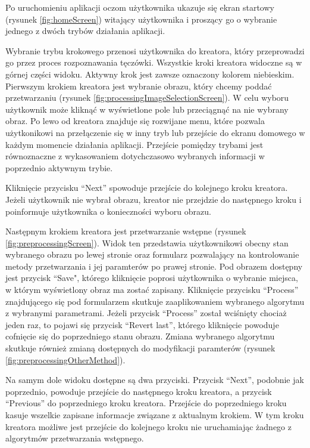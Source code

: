 \documentclass[10pt,polish,a4paper,oneside]{ppfcmthesis}
\begin{document}
Po uruchomieniu aplikacji oczom użytkownika ukazuje się ekran startowy (rysunek \ref{fig:homeScreen}) witający użytkownika
i proszący go o wybranie jednego z dwóch trybów działania aplikacji.\newline

Wybranie trybu krokowego przenosi użytkownika do kreatora, który przeprowadzi go przez proces
rozpoznawania tęczówki. Wszystkie kroki kreatora widoczne są w górnej części widoku. Aktywny krok
jest zawsze oznaczony kolorem niebieskim. Pierwszym krokiem kreatora jest wybranie obrazu, który chcemy
podda\'c przetwarzaniu (rysunek \ref{fig:processingImageSelectionScreen}). W celu wyboru użytkownik może klikną\'c w wyświetlone pole lub
przeciągną\'c na nie wybrany obraz. Po lewo od kreatora znajduje się rozwijane menu, które
pozwala użytkonikowi na przełączenie się w inny tryb lub przejście do ekranu domowego w każdym
momencie działania aplikacji. Przejście pomiędzy trybami jest równoznaczne z wykasowaniem
dotychczasowo wybranych informacji w poprzednio aktywnym trybie.

Kliknięcie przycisku ``Next'' spowoduje przejście do kolejnego kroku kreatora. Jeżeli użytkownik
nie wybrał obrazu, kreator nie przejdzie do następnego kroku i poinformuje użytkownika o konieczności
wyboru obrazu.\newline

Następnym krokiem kreatora jest przetwarzanie wstępne (rysunek \ref{fig:preprocessingScreen}). Widok ten
przedstawia użytkownikowi obecny stan wybranego obrazu po lewej stronie oraz formularz pozwalający
na kontrolowanie metody przetwarzania i jej paramterów po prawej stronie. Pod obrazem dostępny jest
przycisk ``Save", którego kliknięcie poprosi użytkownika o wybranie miejsca, w którym wyświetlony obraz
ma zosta\'c zapisany. Kliknięcie przycisku ``Process'' znajdującego się pod formularzem skutkuje
zaaplikowaniem wybranego algorytmu z wybranymi parametrami. Jeżeli przycisk ``Process'' został wciśnięty
chociaż jeden raz, to pojawi się przycisk ``Revert last'', którego kliknięcie powoduje cofnięcie się
do poprzedniego stanu obrazu. Zmiana wybranego algorytmu skutkuje również zmianą dostępnych
do modyfikacji paramterów (rysunek \ref{fig:preprocessingOtherMethod}).

Na samym dole widoku dostępne są dwa przyciski. Przycisk ``Next'', podobnie
jak poprzednio, powoduje przejście do następnego kroku kreatora, a przycisk ``Previous'' do poprzedniego
kroku kreatora. Przejście do poprzedniego kroku kasuje wszelkie zapisane informacje związane z aktualnym
krokiem. W tym kroku kreatora możliwe jest przejście do kolejnego kroku nie uruchamiając żadnego z
algorytmów przetwarzania wstępnego.\newline
\end{document}
